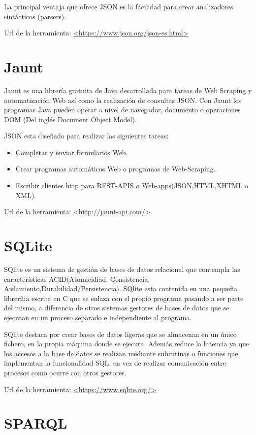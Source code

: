 La principal ventaja que ofrece JSON es la fácilidad para crear analizadores sintácticos (parsers). \cite{wiki:JSON}

Url de la herramienta: \url{<https://www.json.org/json-es.html>}

\section{Jaunt}

Jaunt es una librería gratuita de Java desarrollada para tareas de Web Scraping y automatización Web así como la realización de consultas JSON. Con Jaunt los programas Java pueden operar a nivel de navegador, documento o operaciones DOM (Del inglés Document Object Model).

JSON esta diseñado para realizar las siguientes tareas:
\begin{itemize}
	\item{Completar y enviar formularios Web.}
	\item{Crear programas automáticos Web o programas de Web-Scraping.}
	\item{Escribir clientes http para REST-APIS o Web-apps(JSON,HTML,XHTML o XML).}
\end{itemize}

Url de la herramienta: \url{<http://jaunt-api.com/>}
\section{SQLite}

SQlite es un sistema de gestión de bases de datos relacional que contempla las características ACID(Atomicidiad, Consistencia, Aislamiento,Durabilidad/Persistencia). SQlite esta contenida en una pequeña librerñia escrita en C que se enlaza con el propio programa pasando a ser parte del mismo, a diferencia de otros sistemas gestores de bases de datos que se ejecutan en un proceso separado e independiente al programa.

SQlite destaca por crear bases de datos ligeras que se almacenan en un único fichero, en la propia máquina donde se ejecuta. Además reduce la latencia ya que los accesos a la base de datos se realizan mediante subrutinas o funciones que implementan la funcionalidad SQL, en vez de realizar comunicación entre procesos como ocurre con otros gestores.\cite{wiki:SQlite}

Url de la herramienta: \url{<https://www.sqlite.org/>}

\section{SPARQL}

